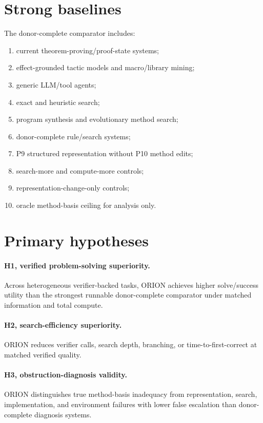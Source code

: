 \documentclass[11pt]{article}
\begin{document}
\section{Strong baselines}
The donor-complete comparator includes:
\begin{enumerate}
    \item current theorem-proving/proof-state systems;
    \item effect-grounded tactic models and macro/library mining;
    \item generic LLM/tool agents;
    \item exact and heuristic search;
    \item program synthesis and evolutionary method search;
    \item donor-complete rule/search systems;
    \item P9 structured representation without P10 method edits;
    \item search-more and compute-more controls;
    \item representation-change-only controls;
    \item oracle method-basis ceiling for analysis only.
\end{enumerate}

\section{Primary hypotheses}
\paragraph{H1, verified problem-solving superiority.}
Across heterogeneous verifier-backed tasks, ORION achieves higher solve/success utility than the strongest runnable donor-complete comparator under matched information and total compute.

\paragraph{H2, search-efficiency superiority.}
ORION reduces verifier calls, search depth, branching, or time-to-first-correct at matched verified quality.

\paragraph{H3, obstruction-diagnosis validity.}
ORION distinguishes true method-basis inadequacy from representation, search, implementation, and environment failures with lower false escalation than donor-complete diagnosis systems.
\end{document}
